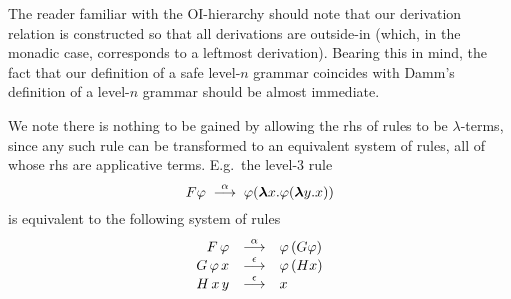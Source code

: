 The reader familiar with the OI-hierarchy should note that our
derivation relation is constructed so that all derivations are
outside-in (which, in the monadic case, corresponds to a leftmost
derivation). Bearing this in mind, the fact that our definition of
a safe level-$n$ grammar coincides with Damm's definition of a
level-$n$ grammar should be almost immediate.

\begin{remark}
We note there is nothing to be gained by allowing the rhs of rules
to be $\lambda$-terms, since any such rule can be transformed to
an equivalent system of rules, all of whose rhs are applicative
terms. E.g.~the level-$3$ rule
\[F \varphi \; \stackrel{{\alpha}}{\longrightarrow} \; \varphi ({\hbox{\boldmath $\lambda$}{x}.{ \varphi({\hbox{\boldmath $\lambda$}{y}.{x}})}})\]
is equivalent to the following system of rules
\[\begin{array}{rcl}
F \, \varphi & \stackrel{{\alpha}}{\longrightarrow} & \varphi \, (G \varphi) \\
G \, \varphi \, x & \stackrel{{\epsilon}}{\longrightarrow} & \varphi \, (H x) \\
H \, x \, y & \stackrel{{\epsilon}}{\longrightarrow} & x \\
\end{array}\]
\end{remark}

